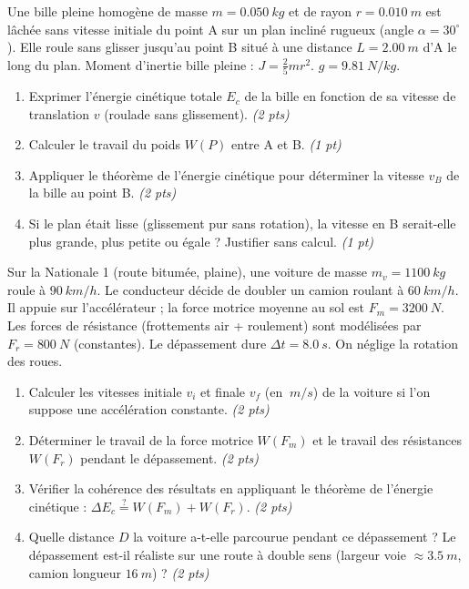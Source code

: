 \documentclass[11pt]{article}
\begin{document}
\begin{exercice}
Une bille pleine homogène de masse $m = \SI{0,050}{kg}$ et de rayon $r = \SI{0,010}{m}$ est lâchée sans vitesse initiale du point A sur un plan incliné rugueux (angle $\alpha = 30^{\circ}$). Elle roule sans glisser jusqu'au point B situé à une distance $L = \SI{2,00}{m}$ d'A le long du plan. Moment d'inertie bille pleine : $J = \frac{2}{5}mr^2$. $g = \SI{9,81}{N/kg}$.
\begin{enumerate}
    \item Exprimer l'énergie cinétique totale $E_c$ de la bille en fonction de sa vitesse de translation $v$ (roulade sans glissement). \textit{(2 pts)}
    \item Calculer le travail du poids $W(P)$ entre A et B. \textit{(1 pt)}
    \item Appliquer le théorème de l'énergie cinétique pour déterminer la vitesse $v_B$ de la bille au point B. \textit{(2 pts)}
    \item Si le plan était lisse (glissement pur sans rotation), la vitesse en B serait-elle plus grande, plus petite ou égale ? Justifier sans calcul. \textit{(1 pt)}
\end{enumerate}
\end{exercice}

\begin{exercice}
Sur la Nationale 1 (route bitumée, plaine), une voiture de masse $m_v = \SI{1100}{kg}$ roule à $\SI{90}{km/h}$. Le conducteur décide de doubler un camion roulant à $\SI{60}{km/h}$. Il appuie sur l'accélérateur ; la force motrice moyenne au sol est $F_m = \SI{3200}{N}$. Les forces de résistance (frottements air + roulement) sont modélisées par $F_r = \SI{800}{N}$ (constantes). Le dépassement dure $\Delta t = \SI{8,0}{s}$. On néglige la rotation des roues.
\begin{enumerate}
    \item Calculer les vitesses initiale $v_i$ et finale $v_f$ (en $\SI{}{m/s}$) de la voiture si l'on suppose une accélération constante. \textit{(2 pts)}
    \item Déterminer le travail de la force motrice $W(F_m)$ et le travail des résistances $W(F_r)$ pendant le dépassement. \textit{(2 pts)}
    \item Vérifier la cohérence des résultats en appliquant le théorème de l'énergie cinétique : $\Delta E_c \stackrel{?}{=} W(F_m) + W(F_r)$. \textit{(2 pts)}
    \item Quelle distance $D$ la voiture a-t-elle parcourue pendant ce dépassement ? Le dépassement est-il réaliste sur une route à double sens (largeur voie $\approx \SI{3,5}{m}$, camion longueur $\SI{16}{m}$) ? \textit{(2 pts)}
\end{enumerate}
\end{exercice}
\end{document}

